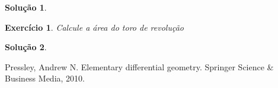 \documentclass[a4paper,12pt]{article}
\theoremstyle{exer}
\newtheorem{exercise}{Exercício}
\theoremstyle{definition}
\newtheorem{solution}{Solução}
\theoremstyle{plain}
\begin{document}
\begin{solution}

\end{solution}

\begin{exercise}
    Calcule a área do toro de revolução
\end{exercise}

\begin{solution}

\end{solution}

\begin{thebibliography}{9}
     Pressley, Andrew N. Elementary differential geometry. Springer Science \& Business Media, 2010.
\end{thebibliography}
\end{document}
